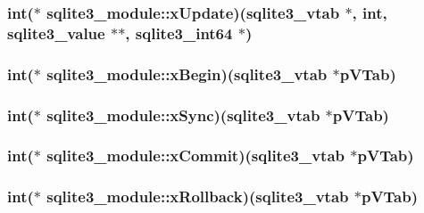 \hypertarget{structsqlite3__module_029d0713dbb3c847a6de773a0a179605}{
\subsubsection[xUpdate]{\setlength{\rightskip}{0pt plus 5cm}int($\ast$ {\bf sqlite3\_\-module::xUpdate})({\bf sqlite3\_\-vtab} $\ast$, int, {\bf sqlite3\_\-value} $\ast$$\ast$, {\bf sqlite3\_\-int64} $\ast$)}}
\label{structsqlite3__module_029d0713dbb3c847a6de773a0a179605}


\hypertarget{structsqlite3__module_f3ea97df2b110da6ceb4797222e6d86f}{
\subsubsection[xBegin]{\setlength{\rightskip}{0pt plus 5cm}int($\ast$ {\bf sqlite3\_\-module::xBegin})({\bf sqlite3\_\-vtab} $\ast$pVTab)}}
\label{structsqlite3__module_f3ea97df2b110da6ceb4797222e6d86f}


\hypertarget{structsqlite3__module_895d78529db2e28e13d1d842512770b6}{
\subsubsection[xSync]{\setlength{\rightskip}{0pt plus 5cm}int($\ast$ {\bf sqlite3\_\-module::xSync})({\bf sqlite3\_\-vtab} $\ast$pVTab)}}
\label{structsqlite3__module_895d78529db2e28e13d1d842512770b6}


\hypertarget{structsqlite3__module_465df78231717713e98677c19e60cece}{
\subsubsection[xCommit]{\setlength{\rightskip}{0pt plus 5cm}int($\ast$ {\bf sqlite3\_\-module::xCommit})({\bf sqlite3\_\-vtab} $\ast$pVTab)}}
\label{structsqlite3__module_465df78231717713e98677c19e60cece}


\hypertarget{structsqlite3__module_3f8676e941a3080557fe10528e04e2f1}{
\subsubsection[xRollback]{\setlength{\rightskip}{0pt plus 5cm}int($\ast$ {\bf sqlite3\_\-module::xRollback})({\bf sqlite3\_\-vtab} $\ast$pVTab)}}
\label{structsqlite3__module_3f8676e941a3080557fe10528e04e2f1}


